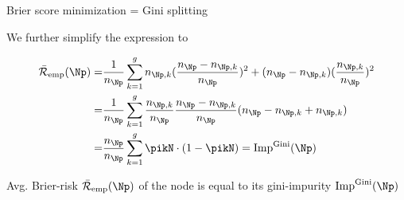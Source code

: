 \documentclass[11pt,compress,t,notes=noshow, xcolor=table]{beamer}
\begin{document}
\begin{frame2}[small]{Brier score minimization = Gini splitting}

We further simplify the expression to

\begin{align*}
\riskeb(\Np) =&  \frac{1}{n_\Np} \sum_{k = 1}^g n_{\Np,k}(\frac{n_{\Np } - n_{\Np,k}}{n_{\Np }})^2 + (n_{\Np } - n_{\Np,k})(\frac{n_{\Np,k}}{n_{\Np }})^2 \\
=& \frac{1}{n_\Np} \sum_{k = 1}^g \frac{n_{\Np,k}}{n_{\Np }} \frac{n_{\Np } - n_{\Np,k}}{n_{\Np }} (n_{\Np } - n_{\Np,k } + n_{\Np,k}) \\
=& \frac{n_{\Np }}{n_\Np} \sum_{k = 1}^g \pikN \cdot (1 - \pikN ) = \text{Imp}^{\text{Gini}}(\Np)
\end{align*} 

Avg. Brier-risk $\riskeb(\Np)$ of the node is equal to its gini-impurity $\text{Imp}^{\text{Gini}}(\Np)$

\end{frame2}
\end{document}
